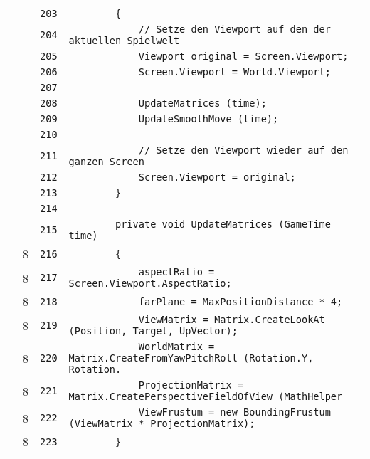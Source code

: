 \documentclass[a4paper,10pt]{article}
\begin{document}
\begin{longtable}[l]{lrrl}
\cellcolor{gray} &  & \verb~203~ & \verb~        {~\\
\cellcolor{gray} &  & \verb~204~ & \verb~            // Setze den Viewport auf den der aktuellen Spielwelt~\\
\cellcolor{gray} &  & \verb~205~ & \verb~            Viewport original = Screen.Viewport;~\\
\cellcolor{gray} &  & \verb~206~ & \verb~            Screen.Viewport = World.Viewport;~\\
\cellcolor{gray} &  & \verb~207~ & \verb~~\\
\cellcolor{gray} &  & \verb~208~ & \verb~            UpdateMatrices (time);~\\
\cellcolor{gray} &  & \verb~209~ & \verb~            UpdateSmoothMove (time);~\\
\cellcolor{gray} &  & \verb~210~ & \verb~~\\
\cellcolor{gray} &  & \verb~211~ & \verb~            // Setze den Viewport wieder auf den ganzen Screen~\\
\cellcolor{gray} &  & \verb~212~ & \verb~            Screen.Viewport = original;~\\
\cellcolor{gray} &  & \verb~213~ & \verb~        }~\\
\cellcolor{gray} &  & \verb~214~ & \verb~~\\
\cellcolor{gray} &  & \verb~215~ & \verb~        private void UpdateMatrices (GameTime time)~\\
\cellcolor{green} & 8 & \verb~216~ & \verb~        {~\\
\cellcolor{green} & 8 & \verb~217~ & \verb~            aspectRatio = Screen.Viewport.AspectRatio;~\\
\cellcolor{green} & 8 & \verb~218~ & \verb~            farPlane = MaxPositionDistance * 4;~\\
\cellcolor{green} & 8 & \verb~219~ & \verb~            ViewMatrix = Matrix.CreateLookAt (Position, Target, UpVector);~\\
\cellcolor{green} & 8 & \verb~220~ & \verb~            WorldMatrix = Matrix.CreateFromYawPitchRoll (Rotation.Y, Rotation.~\\
\cellcolor{green} & 8 & \verb~221~ & \verb~            ProjectionMatrix = Matrix.CreatePerspectiveFieldOfView (MathHelper~\\
\cellcolor{green} & 8 & \verb~222~ & \verb~            ViewFrustum = new BoundingFrustum (ViewMatrix * ProjectionMatrix);~\\
\cellcolor{green} & 8 & \verb~223~ & \verb~        }~\\

\end{longtable}
\end{document}
